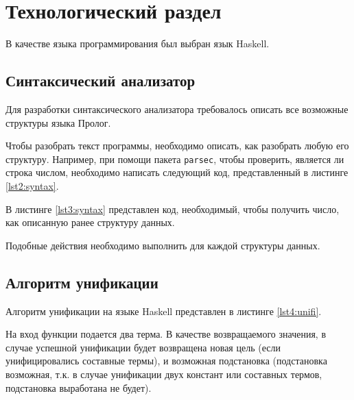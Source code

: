 \chapter{Технологический раздел}

В качестве языка программирования был выбран язык Haskell.  

\section{Синтаксический анализатор}
Для разработки синтаксического анализатора требовалось описать все возможные структуры языка Пролог.



Чтобы разобрать текст программы, необходимо описать, как разобрать любую его структуру. Например, при помощи пакета \texttt{parsec}, чтобы проверить, является ли строка числом, необходимо написать следующий код, представленный в листинге \ref{lst2:syntax}.



В листинге \ref{lst3:syntax} представлен код, необходимый, чтобы получить число, как описанную ранее структуру данных.



Подобные действия необходимо выполнить для каждой структуры данных.

\section{Алгоритм унификации}
Алгоритм унификации на языке Haskell представлен в листинге \ref{lst4:unifi}.


На вход функции подается два терма. В качестве возвращаемого значения, в случае успешной унификации будет возвращена новая цель (если унифицировались составные термы), и возможная подстановка (подстановка возможная, т.к. в случае унификации двух констант или составных термов, подстановка выработана не будет).

